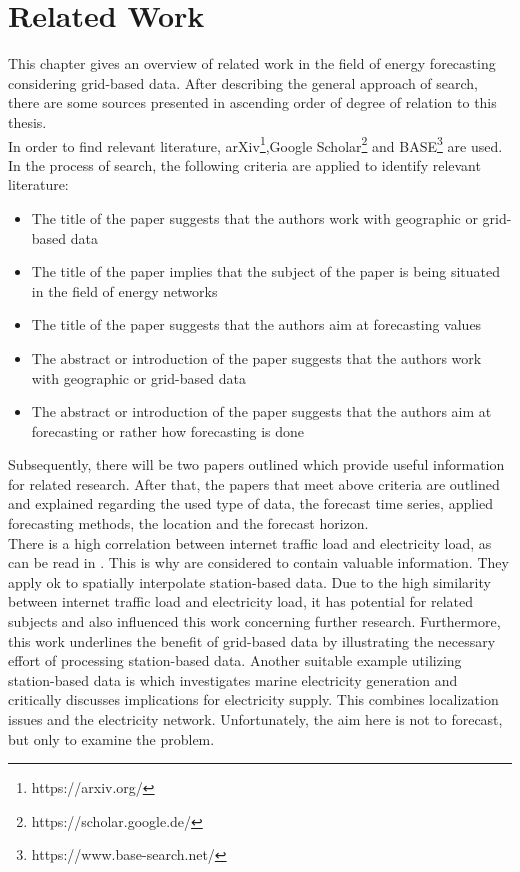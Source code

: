 \chapter{Related Work}
\label{ch:RW}

This chapter gives an overview of related work in the field of energy forecasting considering grid-based data. After describing the general approach of search, there are some sources presented in ascending order of degree of relation to this thesis.\\

In order to find relevant literature, arXiv\footnote{https://arxiv.org/},Google Scholar\footnote{https://scholar.google.de/} and BASE\footnote{https://www.base-search.net/} are used.\\
In the process of search, the following criteria are applied to identify relevant literature:
\begin{itemize}
  \item The title of the paper suggests that the authors work with geographic or grid-based data
  \item The title of the paper implies that the subject of the paper is being situated in the field of energy networks
  \item The title of the paper suggests that the authors aim at forecasting values
  \item The abstract or introduction of the paper suggests that the authors work with geographic or grid-based data
  \item The abstract or introduction of the paper suggests that the authors aim at forecasting or rather how forecasting is done
\end{itemize}

Subsequently, there will be two papers outlined which provide useful information for related research. After that, the papers that meet above criteria are outlined and explained regarding the used type of data, the forecast time series, applied forecasting methods, the location and the forecast horizon.\\

There is a high correlation between internet traffic load and electricity load, as can be read in . This is why  are considered to contain valuable information. They apply \gls{ok} to spatially interpolate station-based data. Due to the high similarity between internet traffic load and electricity load, it has potential for related subjects and also influenced this work \eg concerning further research. Furthermore, this work underlines the benefit of grid-based data by illustrating the necessary effort of processing station-based data. Another suitable example utilizing station-based data is  which investigates marine electricity generation and critically discusses implications for electricity supply. This combines localization issues and the electricity network. Unfortunately, the aim here is not to forecast, but only to examine the problem.\\


